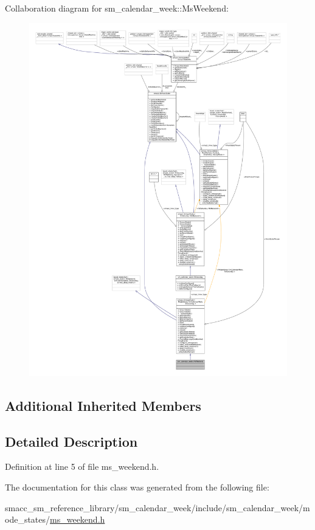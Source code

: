 Collaboration diagram for sm\+\_\+calendar\+\_\+week\+:\+:Ms\+Weekend\+:
\nopagebreak
\begin{figure}[H]
\begin{center}
\leavevmode
\includegraphics[width=350pt]{classsm__calendar__week_1_1MsWeekend__coll__graph}
\end{center}
\end{figure}
\subsection*{Additional Inherited Members}


\subsection{Detailed Description}


Definition at line 5 of file ms\+\_\+weekend.\+h.



The documentation for this class was generated from the following file\+:\begin{DoxyCompactItemize}
\item 
smacc\+\_\+sm\+\_\+reference\+\_\+library/sm\+\_\+calendar\+\_\+week/include/sm\+\_\+calendar\+\_\+week/mode\+\_\+states/\hyperlink{sm__calendar__week_2include_2sm__calendar__week_2mode__states_2ms__weekend_8h}{ms\+\_\+weekend.\+h}\end{DoxyCompactItemize}
